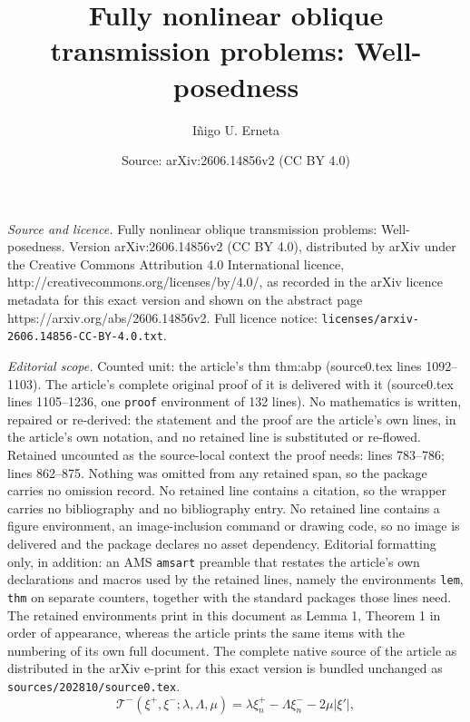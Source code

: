 \documentclass[10pt,a4paper]{amsart}
\title{Fully nonlinear oblique transmission problems: Well-posedness}
\author{I\~nigo U. Erneta}
\date{Source: arXiv:2606.14856v2 (CC BY 4.0)}
\newcommand{\tcal}{\mathcal{T}}
\begin{document}
\maketitle

\noindent\emph{Source and licence.} Fully nonlinear oblique transmission problems: Well-posedness. Version arXiv:2606.14856v2 (CC BY 4.0), distributed by arXiv under the Creative Commons Attribution 4.0 International licence, http://creativecommons.org/licenses/by/4.0/, as recorded in the arXiv licence metadata for this exact version and shown on the abstract page https://arxiv.org/abs/2606.14856v2. Full licence notice: \texttt{licenses/arxiv-2606.14856-CC-BY-4.0.txt}.\par\smallskip

\noindent\textit{Editorial scope.} Counted unit: the article's thm thm:abp (source0.tex lines 1092--1103). The article's complete original proof of it is delivered with it (source0.tex lines 1105--1236, one \texttt{proof} environment of 132 lines). No mathematics is written, repaired or re-derived: the statement and the proof are the article's own lines, in the article's own notation, and no retained line is substituted or re-flowed.  Retained uncounted as the source-local context the proof needs: lines 783--786; lines 862--875.  Nothing was omitted from any retained span, so the package carries no omission record.  No retained line contains a citation, so the wrapper carries no bibliography and no bibliography entry.  No retained line contains a figure environment, an image-inclusion command or drawing code, so no image is delivered and the package declares no asset dependency.  Editorial formatting only, in addition: an AMS \texttt{amsart} preamble that restates the article's own declarations and macros used by the retained lines, namely the environments \texttt{lem}, \texttt{thm} on separate counters, together with the standard packages those lines need.  The retained environments print in this document as Lemma 1, Theorem 1 in order of appearance, whereas the article prints the same items with the numbering of its own full document.  The complete native source of the article as distributed in the arXiv e-print for this exact version is bundled unchanged as \texttt{sources/202810/source0.tex}.
\begin{equation}
\label{tmin}
\tcal^{-}(\xi^{+}, \xi^{-}; \lambda, \Lambda, \mu) = \lambda \xi_n^{+} - \Lambda \xi_n^{-} - 2\mu |\xi'|,
\end{equation}
\end{document}
